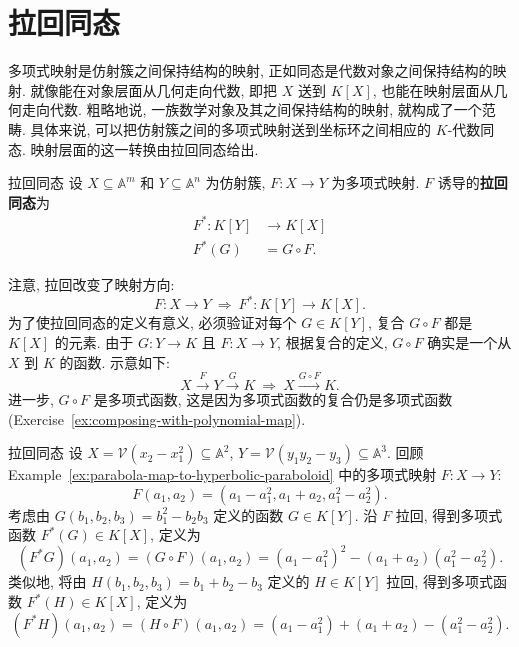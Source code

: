 \section{拉回同态}\label{sec:pullback-homomorphisms}

\BookPairedNote
  {多项式映射是仿射簇之间保持结构的映射, 正如同态是代数对象之间保持结构的映射. 就像能在对象层面从几何走向代数, 即把 $X$ 送到 $K[X]$, 也能在映射层面从几何走向代数.}
  {粗略地说, 一族数学对象及其之间保持结构的映射, 就构成了一个\textquotedbl{}范畴\textquotedbl{}.}
\noindent 具体来说, 可以把仿射簇之间的多项式映射送到坐标环之间相应的 $K$-代数同态. 映射层面的这一转换由拉回同态给出.

\begin{Definition}{拉回同态}\leavevmode\label{def:pullback-homomorphism}
  设 $X\subseteq\mathbb{A}^{m}$ 和 $Y\subseteq\mathbb{A}^{n}$ 为仿射簇, $F:X\to Y$ 为多项式映射. $F$ 诱导的\textbf{拉回同态}为
  \[
    \begin{aligned}
      F^{*}: K[Y]&\to K[X]\\
      F^{*}(G)&=G\circ F.
    \end{aligned}
  \]
\end{Definition}

\BookPairedNoteLeft
  {注意, 拉回改变了映射方向:
   \[
     F:X\to Y\ \Longrightarrow\ F^{*}:K[Y]\to K[X].
   \]}
  {为了使拉回同态的定义有意义, 必须验证对每个 $G\in K[Y]$, 复合 $G\circ F$ 都是 $K[X]$ 的元素. 由于 $G:Y\to K$ 且 $F:X\to Y$, 根据复合的定义, $G\circ F$ 确实是一个从 $X$ 到 $K$ 的函数.}
\noindent 示意如下:
\[
  X\xrightarrow{F}Y\xrightarrow{G}K\ \Longrightarrow\ X\xrightarrow{G\circ F}K.
\]
进一步, $G\circ F$ 是多项式函数, 这是因为多项式函数的复合仍是多项式函数 (Exercise~\ref{ex:composing-with-polynomial-map}).

\begin{Example}{拉回同态}\leavevmode\label{ex:pullback-homomorphism-calculation}
  设 $X=\mathcal{V}(x_{2}-x_{1}^{2})\subseteq\mathbb{A}^{2}$, $Y=\mathcal{V}(y_{1}y_{2}-y_{3})\subseteq\mathbb{A}^{3}$. 回顾 Example~\ref{ex:parabola-map-to-hyperbolic-paraboloid} 中的多项式映射 $F:X\to Y$:
  \[
    F(a_{1},a_{2})=(a_{1}-a_{1}^{2},a_{1}+a_{2},a_{1}^{2}-a_{2}^{2}).
  \]
  考虑由 $G(b_{1},b_{2},b_{3})=b_{1}^{2}-b_{2}b_{3}$ 定义的函数 $G\in K[Y]$. 沿 $F$ 拉回, 得到多项式函数 $F^{*}(G)\in K[X]$, 定义为
  \[
    (F^{*}G)(a_{1},a_{2})=(G\circ F)(a_{1},a_{2})=(a_{1}-a_{1}^{2})^{2}-(a_{1}+a_{2})(a_{1}^{2}-a_{2}^{2}).
  \]
  类似地, 将由 $H(b_{1},b_{2},b_{3})=b_{1}+b_{2}-b_{3}$ 定义的 $H\in K[Y]$ 拉回, 得到多项式函数 $F^{*}(H)\in K[X]$, 定义为
  \[
    (F^{*}H)(a_{1},a_{2})=(H\circ F)(a_{1},a_{2})=(a_{1}-a_{1}^{2})+(a_{1}+a_{2})-(a_{1}^{2}-a_{2}^{2}).
  \]
\end{Example}

